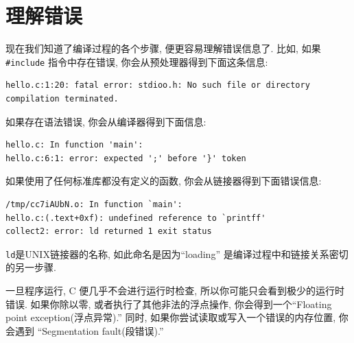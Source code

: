 \documentclass[12pt]{book}
\begin{document}
{%
\section{理解错误}

现在我们知道了编译过程的各个步骤, 
便更容易理解错误信息了.
比如, 如果\verb"#include" 指令中存在错误, 
你会从预处理器得到下面这条信息:

\begin{verbatim}
hello.c:1:20: fatal error: stdioo.h: No such file or directory
compilation terminated.
\end{verbatim}

如果存在语法错误, 你会从编译器得到下面信息:

\begin{verbatim}
hello.c: In function 'main':
hello.c:6:1: error: expected ';' before '}' token
\end{verbatim}

如果使用了任何标准库都没有定义的函数,
你会从链接器得到下面错误信息:

\begin{verbatim}
/tmp/cc7iAUbN.o: In function `main':
hello.c:(.text+0xf): undefined reference to `printff'
collect2: error: ld returned 1 exit status
\end{verbatim}
{\tt ld}是UNIX链接器的名称, 
如此命名是因为``loading'' 是编译过程中和链接关系密切的另一步骤.


一旦程序运行, C 便几乎不会进行运行时检查,
所以你可能只会看到极少的运行时错误.
如果你除以零, 或者执行了其他非法的浮点操作, 
你会得到一个``Floating point exception(浮点异常).''
同时, 如果你尝试读取或写入一个错误的内存位置,
你会遇到 ``Segmentation fault(段错误).''

}
\end{document}
